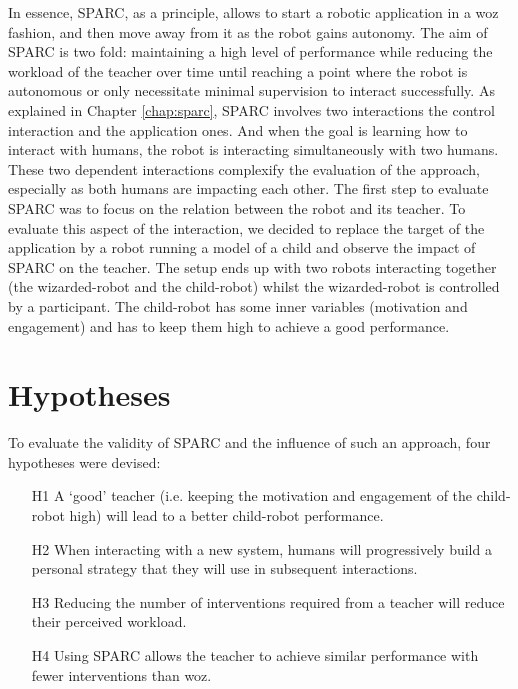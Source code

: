 In essence, SPARC, as a principle, allows to start a robotic application in a \gls{woz} fashion, and then move away from it as the robot gains autonomy. The aim of SPARC is two fold: maintaining a high level of performance while reducing the workload of the teacher over time until reaching a point where the robot is autonomous or only necessitate minimal supervision to interact successfully. As explained in Chapter \ref{chap:sparc}, SPARC involves two interactions the control interaction and the application ones. And when the goal is learning how to interact with humans, the robot is interacting simultaneously with two humans. These two dependent interactions complexify the evaluation of the approach, especially as both humans are impacting each other. The first step to evaluate SPARC was to focus on the relation between the robot and its teacher. To evaluate this aspect of the interaction, we decided to replace the target of the application by a robot running a model of a child and observe the impact of SPARC on the teacher. The setup ends up with two robots interacting together (the wizarded-robot and the child-robot) whilst the wizarded-robot is controlled by a participant. The child-robot has some inner variables (motivation and engagement) and has to keep them high to achieve a good performance.

\section{Hypotheses}


To evaluate the validity of SPARC and the influence of such an approach, four hypotheses were devised:
\begin{enumerate}
	\item [H1] A `good' teacher (i.e. keeping the motivation and engagement of the child-robot high) will lead to a better child-robot performance.
	\item [H2] When interacting with a new system, humans will progressively build a personal strategy that they will use in subsequent interactions.
	\item [H3] Reducing the number of interventions required from a teacher will reduce their perceived workload.
	\item [H4] Using SPARC allows the teacher to achieve similar performance with fewer interventions than \gls{woz}.
\end{enumerate}

